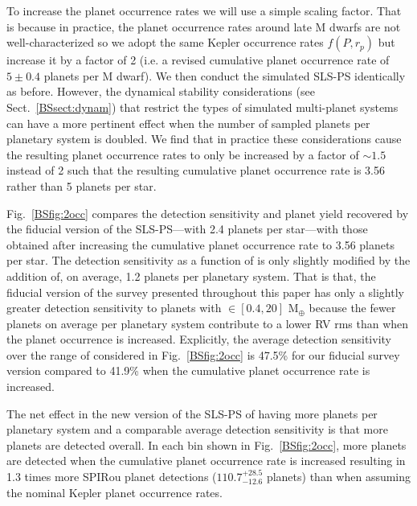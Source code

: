 To increase the planet occurrence rates we will use a simple scaling factor.
That is because in practice, the planet occurrence rates around late M dwarfs are not
well-characterized so we adopt the same Kepler occurrence rates $f(P,r_p)$
but increase it by a factor of 2 (i.e. a revised cumulative planet occurrence
rate of $5 \pm 0.4$ planets per M dwarf). We then conduct the simulated
SLS-PS identically as before. However, the dynamical stability considerations (see 
Sect.~\ref{BSsect:dynam}) that restrict the types of simulated multi-planet systems
can have a more pertinent effect when the number of sampled planets per planetary
system is doubled. We find that in practice these considerations cause the resulting planet
occurrence rates to only be increased by a factor of $\sim 1.5$ instead of 2
such that the resulting cumulative planet occurrence rate is 3.56 rather than 5
planets per star. 

Fig.~\ref{BSfig:2occ} compares the detection sensitivity and planet yield recovered by the
fiducial version of the SLS-PS---with 2.4 planets per star---with those obtained after increasing
the cumulative planet occurrence rate to 3.56 planets per star. The detection sensitivity as
a function of \msini{} is
only slightly modified by the addition of, on average, 1.2 planets per planetary system.
That is that, the fiducial version of the survey presented throughout this paper
has only a slightly greater detection sensitivity to planets with \msini{} $\in [0.4,20]$ M$_{\oplus}$
because the fewer planets on average per planetary system contribute to a
lower RV rms than when the planet occurrence is increased. Explicitly, the average detection sensitivity
over the range of \msini{} considered in Fig.~\ref{BSfig:2occ} is 47.5\% for our fiducial
survey version compared to 41.9\% when the cumulative planet occurrence rate is increased.

The net effect in the new version of the SLS-PS of having more planets per
planetary system and a comparable average detection sensitivity is that more planets are
detected overall. In each \msini{} bin shown in Fig.~\ref{BSfig:2occ}, more planets are detected
when the cumulative planet occurrence rate is increased resulting in
1.3 times more SPIRou planet detections ($110.7^{+28.5}_{-12.6}$ planets) than when assuming the nominal Kepler
planet occurrence rates.


